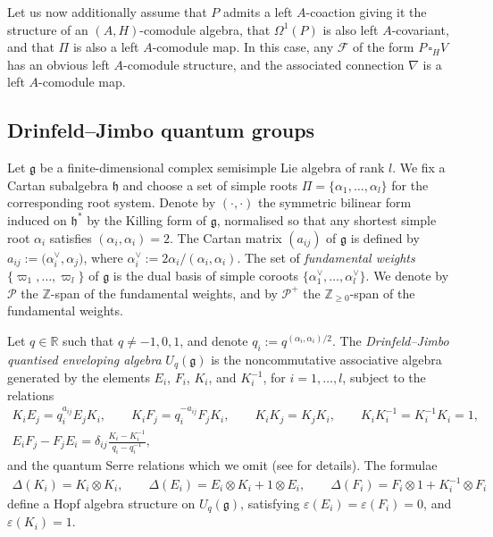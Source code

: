 \documentclass[pdftex]{sigma}
\numberwithin{equation}{section}
\newcommand{\e}{\varepsilon}
\begin{document}
Let us now additionally assume that $P$ admits a left $A$-coaction giving it the structure of an $(A,H)$-comodule algebra, that $\Omega^1(P)$ is also left $A$-covariant, and that $\Pi$ is also a left $A$-comodule map. In this case, any $\mathcal{F}$ of the form $P \, \square_H V$ has an obvious left $A$-comodule structure, and the associated connection $\nabla$ is a left $A$-comodule map.

\subsection{Drinfeld--Jimbo quantum groups}\label{section2.4}

Let $\mathfrak{g}$ be a finite-dimensional complex semisimple Lie algebra of rank $l$. We fix a Cartan subalgebra $\mathfrak{h}$ and choose a set of simple roots $\Pi = \{\alpha_1, \dots, \alpha_l\}$ for the corresponding root system. Denote by $(\cdot,\cdot)$ the symmetric bilinear form induced on $\mathfrak{h}^*$ by the Killing form of $\mathfrak{g}$, normalised so that any shortest simple root $\alpha_i$ satisfies $(\alpha_i,\alpha_i) = 2$. The Cartan matrix $(a_{ij})$ of $\mathfrak{g}$ is defined by
$a_{ij} := \big(\alpha_i^{\vee},\alpha_j\big)$,
where $\alpha_i^{\vee} := 2\alpha_i/(\alpha_i,\alpha_i)$. The set of {\em fundamental weights} $\{\varpi_1, \dots, \varpi_l\}$ of $\mathfrak{g}$ is the dual basis of simple coroots $\big\{\alpha_1^{\vee},\dots, \alpha_l^{\vee}\big\}$. We denote by $\mathcal{P}$ the $\mathbb{Z}$-span of the fundamental weights, and by
${\mathcal P}^+$ the $\mathbb{Z}_{\geq 0}$-span of the fundamental weights.

Let $q \in \mathbb{R}$ such that $q \neq -1,0,1$, and denote $q_i := q^{(\alpha_i,\alpha_i)/2}$. The {\em Drinfeld--Jimbo quantised enveloping algebra} $U_q(\mathfrak{g})$ is the noncommutative associative algebra generated by the elements $E_i$, $F_i$, $K_i$, and $K^{-1}_i$, for $ i=1, \ldots, l$, subject to the relations
\begin{gather*}
 K_iE_j = q_i^{a_{ij}} E_j K_i, \qquad K_iF_j= q_i^{-a_{ij}} F_j K_i, \qquad K_i K_j = K_j K_i, \qquad K_iK_i^{-1} = K_i^{-1}K_i = 1,\\
 E_iF_j - F_jE_i = \delta_{ij}\frac{K_i - K^{-1}_{i}}{q_i-q_i^{-1}},
\end{gather*}
and the quantum Serre relations which we omit (see \cite[Section~6.1.2]{KSLeabh} for details). The formulae
\begin{gather*}
\Delta(K_i) = K_i \otimes K_i, \qquad \Delta(E_i) = E_i \otimes K_i + 1 \otimes E_i, \qquad \Delta(F_i) = F_i \otimes 1 + K_i^{-1} \otimes F_i
\end{gather*}
define a Hopf algebra structure on $U_q(\mathfrak{g})$, satisfying $\e(E_i) = \e(F_i) = 0$, and $\e(K_i) = 1$.
\end{document}
